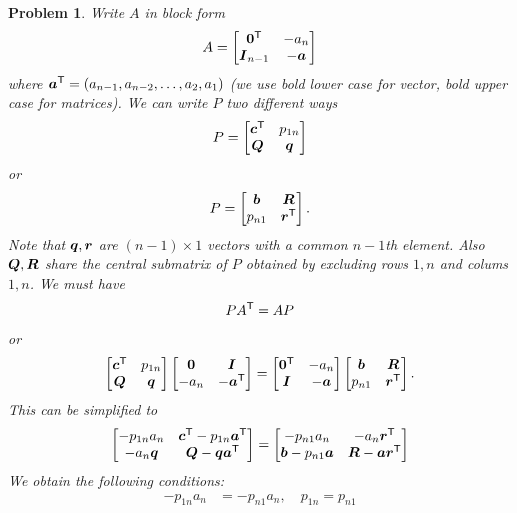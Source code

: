 \documentclass{article}
\theoremstyle{pprop}
\newtheorem{problem}{Problem}[section]
\begin{document}
\begin{problem}
Write $A$ in block form 
$$
A = 
\begin{bmatrix}  
\vb{0}^{\sf T} & - a_n \\
\vb*{I}_{n-1} & -\vb*{a}
\end{bmatrix}
$$ 
where $\vb*{a}^{\sf T}=(a_{n-1},a_{n-2},\ldots,a_2,a_1)$ (we use bold lower case for vector, bold upper case for matrices). 
We can write $P$ two different ways
$$
P = 
\begin{bmatrix}  
\vb*{c}^{\sf T} & p_{1n} \\
\vb*{Q} & \vb*{q}
\end{bmatrix}
$$ 
or
$$
P = 
\begin{bmatrix}  
\vb*{b} & \vb*{R} \\
p_{n1} & \vb*{r}^{\sf T}
\end{bmatrix}.
$$
Note that $\vb*{q}, \vb*{r}$ are $(n-1) \times 1$ vectors with a common $n-1$th element. Also $\vb*{Q}, \vb*{R}$ 
share the central submatrix of $P$ obtained by excluding rows $1,n$ and colums $1,n$.
We must have
$$
P A^{\sf T}=A P 
$$
or
$$
\begin{bmatrix}  
\vb*{c}^{\sf T} & p_{1n} \\
\vb*{Q} & \vb*{q}
\end{bmatrix}
\begin{bmatrix}  
\vb{0} & \vb*{I} \\
-a_n & -\vb*{a}^{\sf T}
\end{bmatrix}=
\begin{bmatrix}  
\vb{0}^{\sf T} & - a_n \\
\vb*{I} & -\vb*{a}
\end{bmatrix}
\begin{bmatrix}  
\vb*{b} & \vb*{R} \\
p_{n1} & \vb*{r}^{\sf T}
\end{bmatrix}.
$$
This can be simplified to
$$
\begin{bmatrix}
-p_{1n}a_n & \vb*{c}^{\sf T}-p_{1n}\vb*{a}^{\sf T} \\
-a_n \vb*{q} & \vb*{Q}- \vb*{q} \vb*{a}^{\sf T}
\end{bmatrix}=
\begin{bmatrix}
-p_{n1}a_n & -a_n \vb*{r}^{\sf T} \\
\vb*{b} - p_{n1}\vb*{a} & \vb*{R}- \vb*{a} \vb*{r}^{\sf T}
\end{bmatrix}
$$
We obtain the following conditions:
\begin{align*}
-p_{1n}a_n & = -p_{n1}a_n, \quad p_{1n}=p_{n1}\\

\end{align*}
\end{problem}
\end{document}
